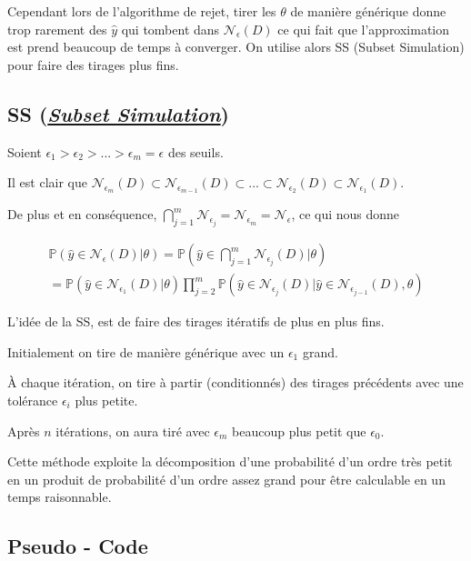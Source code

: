 \documentclass[french,12pt]{article}
\let\oldsubsection\subsection%
\renewcommand{\subsection}{%
  \renewcommand{\theequation}{\thesubsection.\arabic{equation}}%
  \oldsubsection}%
\begin{document}
Cependant lors de l'algorithme de rejet, tirer les $\theta$ de manière générique donne trop rarement des $\hat{y}$ qui tombent dans $\mathcal{N}_{\epsilon} (D)$
ce qui fait que l'approximation est prend beaucoup de temps à converger. On utilise alors SS (Subset Simulation)
pour faire des tirages plus fins.

\subsection{SS (\href{https://en.wikipedia.org/wiki/Subset_simulation}{\textit{Subset Simulation}})}

Soient $\epsilon_1 > \epsilon_2 > ... >\epsilon_m = \epsilon$ des seuils.

Il est clair que $\mathcal{N}_{\epsilon_m} (D)\subset \mathcal{N}_{\epsilon_{m - 1}} (D)
    \subset ... \subset \mathcal{N}_{\epsilon_{2}} (D) \subset \mathcal{N}_{\epsilon_{1}} (D)$.

De plus et en conséquence, $\bigcap_{j = 1}^m \mathcal{N}_{\epsilon_j} = \mathcal{N}_{\epsilon_m} = \mathcal{N}_{\epsilon} $, ce qui nous donne

\begin{align}
    \mathbb{P} \left(\hat{y} \in \mathcal{N}_{\epsilon} (D)| \theta \right) = \mathbb{P} \left(\hat{y} \in \bigcap_{j = 1}^m \mathcal{N}_{\epsilon_j} (D)| \theta\right) \\
    = \mathbb{P} \left(\hat{y} \in \mathcal{N}_{\epsilon_1} (D)| \theta\right)
    \prod_{j = 2}^{m} \mathbb{P} \left(\hat{y} \in \mathcal{N}_{\epsilon_j} (D)|\hat{y} \in \mathcal{N}_{\epsilon_{j - 1}} (D), \theta\right)
\end{align}


L'idée de la SS, est de faire des tirages itératifs de plus en plus fins.

Initialement on tire de manière générique avec un $\epsilon_1$ grand.

À chaque itération, on tire à partir (conditionnés) des tirages précédents avec une tolérance $\epsilon_i$ plus petite.

Après $n$ itérations, on aura tiré avec $\epsilon_m$ beaucoup plus petit que $\epsilon_0$.

Cette méthode exploite la décomposition d'une probabilité d'un ordre très petit
en un produit de probabilité d'un ordre assez grand pour être calculable en un temps raisonnable.



\subsection{Pseudo - Code}
\end{document}
